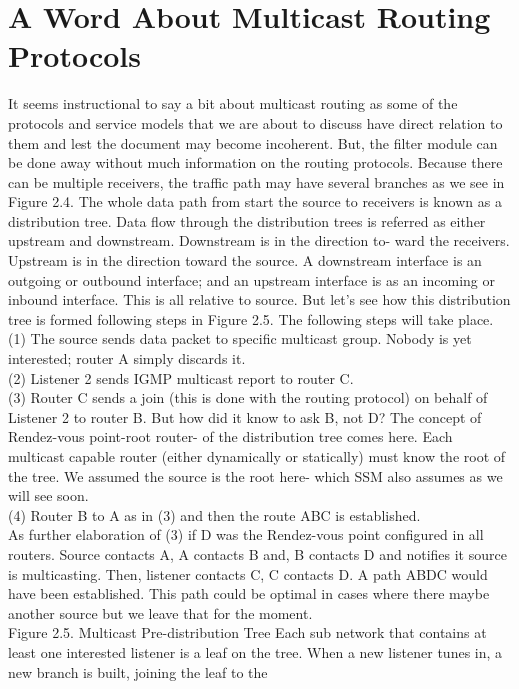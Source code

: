 \documentclass[11pt,left=2cm,bottom=2cm,oneside]{book}
\begin{document}
\section{A Word About Multicast Routing Protocols}
It seems instructional to say a bit about multicast routing as some of the
protocols and service models that we are about to discuss have direct relation
to
them and lest the document may become incoherent. But, the filter module can
be
done away without much information on the routing protocols.
Because there can be multiple receivers, the traffic path may have several
branches as we see in Figure 2.4. The whole data path from start the source to
receivers is known as a distribution tree. Data flow through the distribution
trees
is referred as either upstream and downstream. Downstream is in the direction
to-
ward the receivers. Upstream is in the direction toward the source. A
downstream
interface is an outgoing or outbound interface; and an upstream interface is
as an
incoming or inbound interface. This is all relative to source.
But let's see how this distribution tree is formed following steps in Figure
2.5.
The following steps will take place.
(1) The source sends data packet to specific multicast group. Nobody is yet
interested; router A simply discards it.\\
(2) Listener 2 sends IGMP multicast report to router C.\\
(3) Router C sends a join (this is done with the routing protocol) on behalf
of Listener 2 to router B. But how did it know to ask B, not D? The
concept of Rendez-vous point-root router- of the distribution tree comes
here. Each multicast capable router (either dynamically or statically)
must know the root of the tree. We assumed the source is the root here-
which SSM also assumes as we will see soon.\\
(4) Router B to A as in (3) and then the route ABC is established.\\
As further elaboration of (3) if D was the Rendez-vous point configured in all
routers. Source contacts A, A contacts B and, B contacts D and notifies it
source is
multicasting. Then, listener contacts C, C contacts D. A path ABDC would have
been established. This path could be optimal in cases where there maybe
another
source but we leave that for the moment.\\
Figure 2.5. Multicast Pre-distribution Tree
Each sub network that contains at least one interested listener is a leaf on
the
tree. When a new listener tunes in, a new branch is built, joining the leaf to
the
\end{document}
